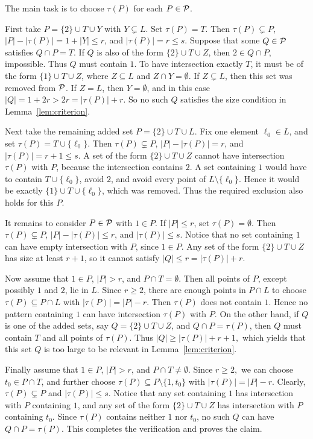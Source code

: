 \begin{poc}
The main task is to choose \(\tau(P)\) for each \(P\in\mathcal{P}\).

First take \(P=\{2\}\cup T\cup Y\) with \(Y\subsetneq L\). Set \(\tau(P)=T\). Then \(\tau(P)\subsetneq P\), \(|P|-|\tau(P)|=1+|Y|\le r\), and \(|\tau(P)|=r\le s\). Suppose that some \(Q\in\mathcal{P}\) satisfies \(Q\cap P=T\). If \(Q\) is also of the form \(\{2\}\cup T\cup Z\), then \(2\in Q\cap P\), impossible. Thus \(Q\) must contain \(1\). To have intersection exactly \(T\), it must be of the form \(\{1\}\cup T\cup Z\), where \(Z\subseteq L\) and \(Z\cap Y=\emptyset\). If \(Z\subsetneq L\), then this set was removed from \(\mathcal{P}\). If \(Z=L\), then \(Y=\emptyset\), and in this case \(|Q|=1+2r>2r=|\tau(P)|+r.\)
So no such \(Q\) satisfies the size condition in Lemma~\ref{lem:criterion}.

Next take the remaining added set \(P=\{2\}\cup T\cup L\). Fix one element \(\ell_0\in L\), and set \(\tau(P)=T\cup\{\ell_0\}\). Then \(\tau(P)\subsetneq P\), \(|P|-|\tau(P)|=r\), and \(|\tau(P)|=r+1\le s\). A set of the form \(\{2\}\cup T\cup Z\) cannot have intersection \(\tau(P)\) with \(P\), because the intersection contains \(2\). A set containing \(1\) would have to contain \(T\cup\{\ell_0\}\), avoid \(2\), and avoid every point of \(L\setminus\{\ell_0\}\). Hence it would be exactly \(\{1\}\cup T\cup\{\ell_0\}\), which was removed. Thus the required exclusion also holds for this \(P\).

It remains to consider \(P\in\mathcal{P}\) with \(1\in P\). If \(|P|\le r\), set \(\tau(P)=\emptyset\). Then \(\tau(P)\subsetneq P\), \(|P|-|\tau(P)|\le r\), and \(|\tau(P)|\le s\). Notice that no set containing \(1\) can have empty intersection with \(P\), since \(1\in P\). Any set of the form \(\{2\}\cup T\cup Z\) has size at least \(r+1\), so it cannot satisfy \(|Q|\le r=|\tau(P)|+r\).

Now assume that \(1\in P\), \(|P|>r\), and \(P\cap T=\emptyset\). Then all points of \(P\), except possibly \(1\) and \(2\), lie in \(L\). Since \(r\ge2\), there are enough points in \(P\cap L\) to choose
\(\tau(P)\subseteq P\cap L\) with \(|\tau(P)|=|P|-r.\)
Then \(\tau(P)\) does not contain \(1\). Hence no pattern containing \(1\) can have intersection \(\tau(P)\) with \(P\). On the other hand, if \(Q\) is one of the added sets, say \(Q=\{2\}\cup T\cup Z\), and \(Q\cap P=\tau(P)\), then \(Q\) must contain \(T\) and all points of \(\tau(P)\). Thus \(|Q|\ge |\tau(P)|+r+1,\)
which yields that this set \(Q\) is too large to be relevant in Lemma~\ref{lem:criterion}.

Finally assume that \(1\in P\), \(|P|>r\), and \(P\cap T\ne\emptyset\). Since \(r\ge 2,\) we can choose \(t_0\in P\cap T\), and further choose \(\tau(P)\subseteq P\setminus\{1,t_0\}\) with \(|\tau(P)|=|P|-r.\) Clearly, \(\tau(P)\subsetneq P\) and \(|\tau(P)|\le s\). Notice that any set containing \(1\) has intersection with \(P\) containing \(1\), and any set of the form \(\{2\}\cup T\cup Z\) has intersection with \(P\) containing \(t_0\). Since \(\tau(P)\) contains neither \(1\) nor \(t_0\), no such \(Q\) can have \(Q\cap P=\tau(P)\). This completes the verification and proves the claim.
\end{poc}

